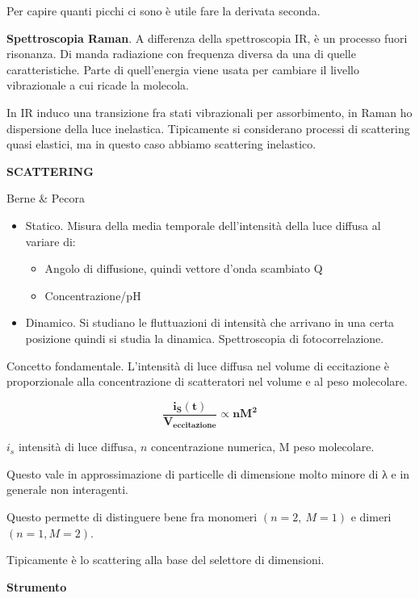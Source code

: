 Per capire quanti picchi ci sono è utile fare la derivata seconda.

\textbf{Spettroscopia Raman}. A differenza della spettroscopia IR, è un
processo fuori risonanza. Di manda radiazione con frequenza diversa da
una di quelle caratteristiche. Parte di quell'energia viene usata per
cambiare il livello vibrazionale a cui ricade la molecola.

In IR induco una transizione fra stati vibrazionali per assorbimento, in
Raman ho dispersione della luce inelastica. Tipicamente si considerano
processi di scattering quasi elastici, ma in questo caso abbiamo
scattering inelastico.

\textbf{SCATTERING}

Berne \& Pecora

\begin{itemize}
\item
  Statico. Misura della media temporale dell'intensità della luce
  diffusa al variare di:

  \begin{itemize}
  \item
    Angolo di diffusione, quindi vettore d'onda scambiato Q
  \item
    Concentrazione/pH
  \end{itemize}
\item
  Dinamico. Si studiano le fluttuazioni di intensità che arrivano in una
  certa posizione quindi si studia la dinamica. Spettroscopia di
  fotocorrelazione.
\end{itemize}

Concetto fondamentale. L'intensità di luce diffusa nel volume di
eccitazione è proporzionale alla concentrazione di scatteratori nel
volume e al peso molecolare.

\[\frac{\mathbf{i}_{\mathbf{S}}\left( \mathbf{t} \right)}{\mathbf{V}_{\mathbf{\text{eccitazione}}}}\mathbf{\propto n}\mathbf{M}^{\mathbf{2}}\]

\(i_{s}\) intensità di luce diffusa, \(n\) concentrazione numerica, M
peso molecolare.

Questo vale in approssimazione di particelle di dimensione molto minore
di λ e in generale non interagenti.

Questo permette di distinguere bene fra monomeri \((n = 2,\ M = 1)\) e
dimeri \((n = 1,M = 2)\).

Tipicamente è lo scattering alla base del selettore di dimensioni.

\textbf{Strumento}

